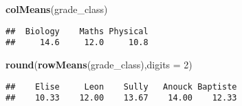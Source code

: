 \documentclass[
]{article}
\newenvironment{Shaded}{\begin{snugshade}}{\end{snugshade}}
\newcommand{\AttributeTok}[1]{\textcolor[rgb]{0.13,0.29,0.53}{#1}}
\newcommand{\DecValTok}[1]{\textcolor[rgb]{0.00,0.00,0.81}{#1}}
\newcommand{\FunctionTok}[1]{\textcolor[rgb]{0.13,0.29,0.53}{\textbf{#1}}}
\newcommand{\NormalTok}[1]{#1}
\begin{document}
\begin{Shaded}
\begin{Highlighting}[]
\FunctionTok{colMeans}\NormalTok{(grade\_class)}
\end{Highlighting}
\end{Shaded}

\begin{verbatim}
##  Biology    Maths Physical 
##     14.6     12.0     10.8
\end{verbatim}

\begin{Shaded}
\begin{Highlighting}[]
\FunctionTok{round}\NormalTok{(}\FunctionTok{rowMeans}\NormalTok{(grade\_class),}\AttributeTok{digits =} \DecValTok{2}\NormalTok{)}
\end{Highlighting}
\end{Shaded}

\begin{verbatim}
##    Elise     Leon    Sully   Anouck Baptiste 
##    10.33    12.00    13.67    14.00    12.33
\end{verbatim}
\end{document}
